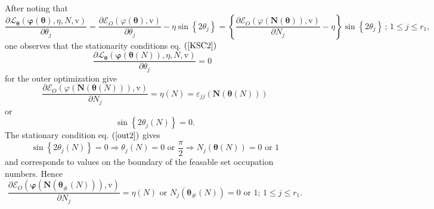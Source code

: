\documentclass[aps,preprint]{revtex4}%
\begin{document}
After noting that
\begin{equation}
\frac{\partial\mathcal{L}_{\boldsymbol{\theta}}\left(  \boldsymbol{\varphi
}\left(  \boldsymbol{\theta}\right)  ,\eta,N,\mathrm{v}\right)  }%
{\partial\theta_{j}}=\frac{\partial\mathcal{E}_{O}\left(  \varphi\left(
\boldsymbol{\theta}\right)  ,\mathrm{v}\right)  }{\partial\theta_{j}}-\eta
\sin\left\{  2\theta_{j}\right\}  =\left\{  \frac{\partial\mathcal{E}%
_{O}\left(  \varphi\left(  \boldsymbol{N}\left(  \boldsymbol{\theta}\right)
\right)  ,\mathrm{v}\right)  }{\partial N_{j}}-\eta\right\}  \sin\left\{
2\theta_{j}\right\}  \,;\,1\leq j\leq r_{1},
\end{equation}
one observes that the stationarity conditions eq. $\left(  \ref{KSC2}\right)
$
\begin{equation}
\frac{\partial\mathcal{L}_{\boldsymbol{\theta}}\left(  \boldsymbol{\varphi
}\left(  \boldsymbol{\theta}\left(  N\right)  \right)  ,\eta\boldsymbol{,}%
N\boldsymbol{,}\mathrm{v}\right)  }{\partial\theta_{j}}=0\text{ }%
\end{equation}
for the outer optimization give%
\begin{equation}
\frac{\partial\mathcal{E}_{O}\left(  \varphi\left(  \boldsymbol{N}\left(
\boldsymbol{\theta}\left(  N\right)  \right)  \right)  ,\mathrm{v}\right)
}{\partial N_{j}}=\eta\left(  N\right)  =\varepsilon_{jj}\left(
\boldsymbol{\boldsymbol{N}}\left(  \boldsymbol{\theta}\left(  N\right)
\right)  \right)  \label{out1}%
\end{equation}
or%
\begin{equation}
\sin\left\{  2\theta_{j}\left(  N\right)  \right\}  =0. \label{out2}%
\end{equation}
The stationary condition eq. $\left(  \ref{out2}\right)  $ gives
\begin{equation}
\sin\left\{  2\theta_{j}\left(  N\right)  \right\}  =0\Rightarrow\theta
_{j}\left(  N\right)  =0\text{ or }\frac{\pi}{2}\Rightarrow N_{j}\left(
\boldsymbol{\theta}\left(  N\right)  \right)  =0\text{ or }1
\end{equation}
and corresponds to values on the boundary of the feasable set occupation
numbers. Hence
\begin{equation}
\frac{\partial\mathcal{E}_{O}\left(  \boldsymbol{\varphi}\left(
\boldsymbol{N}\left(  \boldsymbol{\theta}_{\#}\left(  N\right)  \right)
\right)  \boldsymbol{,}\mathrm{v}\right)  }{\partial N_{j}}=\eta\left(
N\right)  \text{ or }N_{j}\left(  \boldsymbol{\theta}_{\#}\left(  N\right)
\right)  =0\text{ or }1;\,1\leq j\leq r_{1}.
\end{equation}
\end{document}
